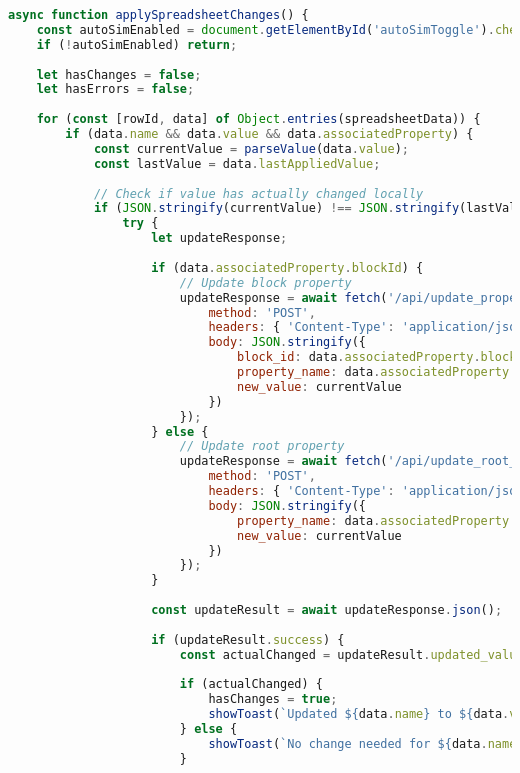 \documentclass[12pt,a4paper]{article}
\begin{document}
\begin{lstlisting}[language=JavaScript, caption=Auto-Trigger Logic]
async function applySpreadsheetChanges() {
    const autoSimEnabled = document.getElementById('autoSimToggle').checked;
    if (!autoSimEnabled) return;
    
    let hasChanges = false;
    let hasErrors = false;
    
    for (const [rowId, data] of Object.entries(spreadsheetData)) {
        if (data.name && data.value && data.associatedProperty) {
            const currentValue = parseValue(data.value);
            const lastValue = data.lastAppliedValue;
            
            // Check if value has actually changed locally
            if (JSON.stringify(currentValue) !== JSON.stringify(lastValue)) {
                try {
                    let updateResponse;
                    
                    if (data.associatedProperty.blockId) {
                        // Update block property
                        updateResponse = await fetch('/api/update_property', {
                            method: 'POST',
                            headers: { 'Content-Type': 'application/json' },
                            body: JSON.stringify({
                                block_id: data.associatedProperty.blockId,
                                property_name: data.associatedProperty.name,
                                new_value: currentValue
                            })
                        });
                    } else {
                        // Update root property
                        updateResponse = await fetch('/api/update_root_property', {
                            method: 'POST',
                            headers: { 'Content-Type': 'application/json' },
                            body: JSON.stringify({
                                property_name: data.associatedProperty.name,
                                new_value: currentValue
                            })
                        });
                    }
                    
                    const updateResult = await updateResponse.json();
                    
                    if (updateResult.success) {
                        const actualChanged = updateResult.updated_value !== data.lastAppliedValue;
                        
                        if (actualChanged) {
                            hasChanges = true;
                            showToast(`Updated ${data.name} to ${data.value}`, 'success');
                        } else {
                            showToast(`No change needed for ${data.name}`, 'info');
                        }
                        

\end{lstlisting}
\end{document}
